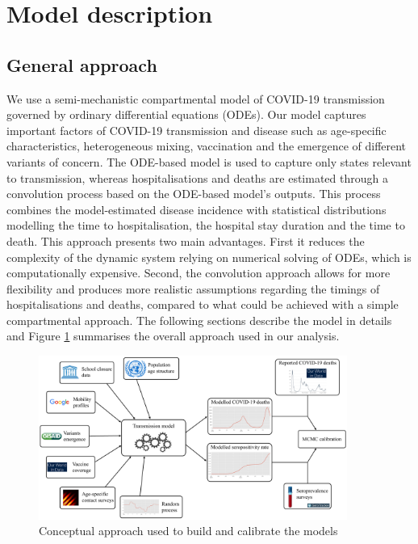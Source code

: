 
\section{Model description}

\subsection{General approach}
We use a semi-mechanistic compartmental model of COVID-19 transmission governed by ordinary differential equations (ODEs). 
Our model captures important factors of COVID-19 transmission and disease such as age-specific characteristics, 
heterogeneous mixing, vaccination and the emergence of different variants of concern. 
The ODE-based model is used to capture only states relevant to transmission, whereas hospitalisations and deaths are
estimated through a convolution process based on the ODE-based model's outputs. This process combines the model-estimated disease incidence with 
statistical distributions modelling the time to hospitalisation, the hospital stay duration and the time to death.
This approach presents two main advantages. First it reduces the complexity of the dynamic system relying on 
numerical solving of ODEs, which is computationally expensive. Second, the convolution approach allows for more flexibility 
and produces more realistic assumptions regarding the timings of hospitalisations and deaths, 
compared to what could be achieved with a simple compartmental approach. The following sections describe the model in details
and Figure \ref{fig:concept} summarises the overall approach used in our analysis.

\begin{figure}[ht]
    \begin{center}
    \includegraphics[width=0.9\textwidth]{../../tex_descriptions/models/sm_covid/Conceptual_approach.pdf}
    \end{center}
    \caption{Conceptual approach used to build and calibrate the models} 
    \label{fig:concept}
\end{figure}

